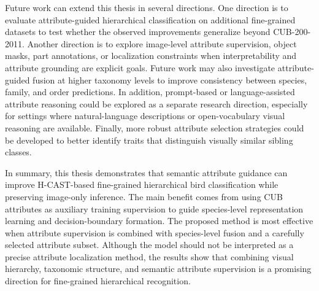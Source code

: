 Future work can extend this thesis in several directions. One direction is to evaluate attribute-guided hierarchical classification on additional fine-grained datasets to test whether the observed improvements generalize beyond CUB-200-2011. Another direction is to explore image-level attribute supervision, object masks, part annotations, or localization constraints when interpretability and attribute grounding are explicit goals. Future work may also investigate attribute-guided fusion at higher taxonomy levels to improve consistency between species, family, and order predictions. In addition, prompt-based or language-assisted attribute reasoning could be explored as a separate research direction, especially for settings where natural-language descriptions or open-vocabulary visual reasoning are available. Finally, more robust attribute selection strategies could be developed to better identify traits that distinguish visually similar sibling classes.

In summary, this thesis demonstrates that semantic attribute guidance can improve H-CAST-based fine-grained hierarchical bird classification while preserving image-only inference. The main benefit comes from using CUB attributes as auxiliary training supervision to guide species-level representation learning and decision-boundary formation. The proposed method is most effective when attribute supervision is combined with species-level fusion and a carefully selected attribute subset. Although the model should not be interpreted as a precise attribute localization method, the results show that combining visual hierarchy, taxonomic structure, and semantic attribute supervision is a promising direction for fine-grained hierarchical recognition.